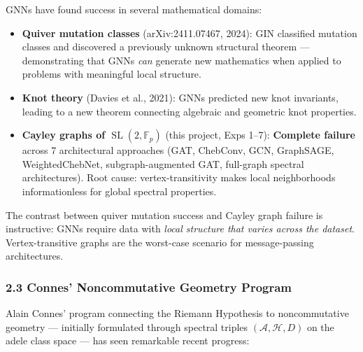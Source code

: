 \documentclass[
]{article}
\begin{document}
GNNs have found success in several mathematical domains:

\begin{itemize}
\item
  \textbf{Quiver mutation classes} (arXiv:2411.07467, 2024): GIN
  classified mutation classes and discovered a previously unknown
  structural theorem --- demonstrating that GNNs \emph{can} generate new
  mathematics when applied to problems with meaningful local structure.
\item
  \textbf{Knot theory} (Davies et al., 2021): GNNs predicted new knot
  invariants, leading to a new theorem connecting algebraic and
  geometric knot properties.
\item
  \textbf{Cayley graphs of \(\operatorname{SL}(2,\mathbb{F}_p)\)} (this
  project, Exps 1--7): \textbf{Complete failure} across 7 architectural
  approaches (GAT, ChebConv, GCN, GraphSAGE, WeightedChebNet,
  subgraph-augmented GAT, full-graph spectral architectures). Root
  cause: vertex-transitivity makes local neighborhoods informationless
  for global spectral properties.
\end{itemize}

The contrast between quiver mutation success and Cayley graph failure is
instructive: GNNs require data with \emph{local structure that varies
across the dataset}. Vertex-transitive graphs are the worst-case
scenario for message-passing architectures.

\hypertarget{connes-noncommutative-geometry-program}{%
\subsubsection{2.3 Connes' Noncommutative Geometry
Program}\label{connes-noncommutative-geometry-program}}

Alain Connes' program connecting the Riemann Hypothesis to
noncommutative geometry --- initially formulated through spectral
triples \((\mathcal{A}, \mathcal{H}, D)\) on the adele class space ---
has seen remarkable recent progress:
\end{document}
